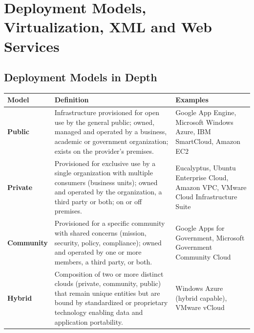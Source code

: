 \chapter{Deployment Models, Virtualization, XML and Web Services}

\section{Deployment Models in Depth}
\begin{center}
\begin{tabularx}{\textwidth}{>{\bfseries}lXX}
\toprule
Model & Definition & Examples\\
\midrule
Public & Infrastructure provisioned for open use by the general public; owned, managed and operated by a
business, academic or government organization; exists on the provider's premises. & Google App Engine,
Microsoft Windows Azure, IBM SmartCloud, Amazon EC2\\
Private & Provisioned for exclusive use by a single organization with multiple consumers (business
units); owned and operated by the organization, a third party or both; on or off premises. & Eucalyptus,
Ubuntu Enterprise Cloud, Amazon VPC, VMware Cloud Infrastructure Suite\\
Community & Provisioned for a specific community with shared concerns (mission, security, policy,
compliance); owned and operated by one or more members, a third party, or both. & Google Apps for
Government, Microsoft Government Community Cloud\\
Hybrid & Composition of two or more distinct clouds (private, community, public) that remain unique
entities but are bound by standardized or proprietary technology enabling data and application
portability. & Windows Azure (hybrid capable), VMware vCloud\\
\bottomrule
\end{tabularx}
\end{center}

